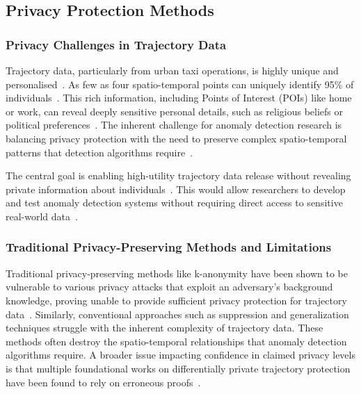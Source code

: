 \documentclass[runningheads]{llncs}
\begin{document}
\subsection{Privacy Protection Methods}
\label{sec:privacy-review}

\subsubsection{Privacy Challenges in Trajectory Data}

Trajectory data, particularly from urban taxi operations, is highly unique and personalised~\cite{Primault2019LongRoad,Buchholz2022RAoPT,Ma2021TrajectoryPrivacy}. As few as four spatio-temporal points can uniquely identify 95\% of individuals~\cite{Primault2019LongRoad,Buchholz2022RAoPT,Ma2021TrajectoryPrivacy}. This rich information, including Points of Interest (POIs) like home or work, can reveal deeply sensitive personal details, such as religious beliefs or political preferences~\cite{Primault2019LongRoad,Buchholz2022RAoPT}. The inherent challenge for anomaly detection research is balancing privacy protection with the need to preserve complex spatio-temporal patterns that detection algorithms require~\cite{Buchholz2024SoK,Buchholz2022RAoPT,Primault2019LongRoad,Naghizade2020PrivacyContextAware}.

The central goal is enabling high-utility trajectory data release without revealing private information about individuals~\cite{Buchholz2024SoK,Rao2021LSTMTrajGAN,Liu2018TrajGANs,Jin2023SurveyExpStudy,Ma2021TrajectoryPrivacy,Naghizade2020PrivacyContextAware}. This would allow researchers to develop and test anomaly detection systems without requiring direct access to sensitive real-world data~\cite{Buchholz2024SoK,Rao2021LSTMTrajGAN,Liu2018TrajGANs}.

\subsubsection{Traditional Privacy-Preserving Methods and Limitations}

Traditional privacy-preserving methods like k-anonymity have been shown to be vulnerable to various privacy attacks that exploit an adversary's background knowledge, proving unable to provide sufficient privacy protection for trajectory data~\cite{Chen2011DPTP,Buchholz2022RAoPT,Jin2023SurveyExpStudy}. Similarly, conventional approaches such as suppression and generalization techniques struggle with the inherent complexity of trajectory data. These methods often destroy the spatio-temporal relationships that anomaly detection algorithms require. A broader issue impacting confidence in claimed privacy levels is that multiple foundational works on differentially private trajectory protection have been found to rely on erroneous proofs~\cite{Buchholz2024SoK,Primault2014DPLPP,Errounda2019AnalysisDPLocation}.
\end{document}
